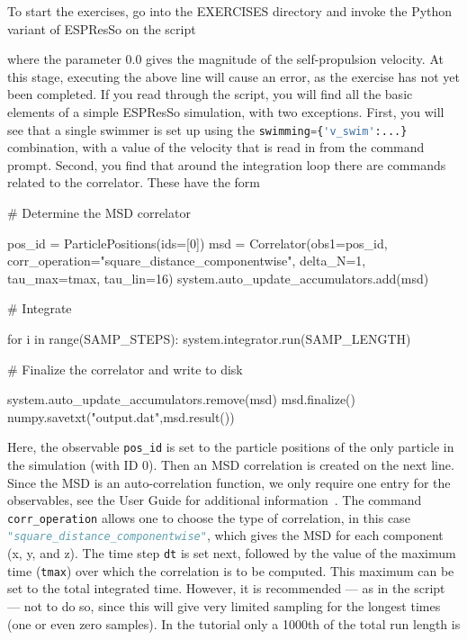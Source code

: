 \documentclass[aip,jcp,reprint,a4paper,onecolumn,amsmath]{revtex4-1}
\newcommand{\es}{\mbox{\textsf{ESPResSo}}\xspace}
\newcommand\codees{\lstinline[language=python]}
\begin{document}
To start the exercises, go into the EXERCISES directory and invoke the Python variant of \es{} on the script
where the parameter 0.0 gives the magnitude of the self-propulsion velocity. At
this stage, executing the above line will cause an error, as the exercise has
not yet been completed. If you read through the script, you will find all the
basic elements of a simple \es{} simulation, with two exceptions. First, you
will see that a single swimmer is set up using the
\codees|swimming={'v_swim':...}| combination, with a value of the velocity that
is read in from the command prompt. Second, you find that around the
integration loop there are commands related to the correlator. These have the
form
\begin{espresso}
# Determine the MSD correlator

pos_id = ParticlePositions(ids=[0])
msd = Correlator(obs1=pos_id,
                   corr_operation="square_distance_componentwise",
                   delta_N=1,
                   tau_max=tmax,
                   tau_lin=16)
system.auto_update_accumulators.add(msd)

# Integrate

for i in range(SAMP_STEPS):
    system.integrator.run(SAMP_LENGTH)

# Finalize the correlator and write to disk

system.auto_update_accumulators.remove(msd)
msd.finalize()
numpy.savetxt("output.dat",msd.result())
\end{espresso}
Here, the observable \codees{pos_id} is set to the particle positions of the
only particle in the simulation (with ID 0). Then an MSD correlation is created
on the next line. Since the MSD is an auto-correlation function, we only
require one entry for the observables, see the User Guide for additional
information~\cite{UG}. The command \codees{corr_operation} allows one to choose
the type of correlation, in this case \codees{"square_distance_componentwise"},
which gives the MSD for each component (x, y, and z). The time step \codees{dt}
is set next, followed by the value of the maximum time (\codees{tmax}) over
which the correlation is to be computed. This maximum can be set to the total
integrated time. However, it is recommended --- as in the script --- not to do
so, since this will give very limited sampling for the longest times (one or
even zero samples). In the tutorial only a 1000th of the total run length is
\end{document}
